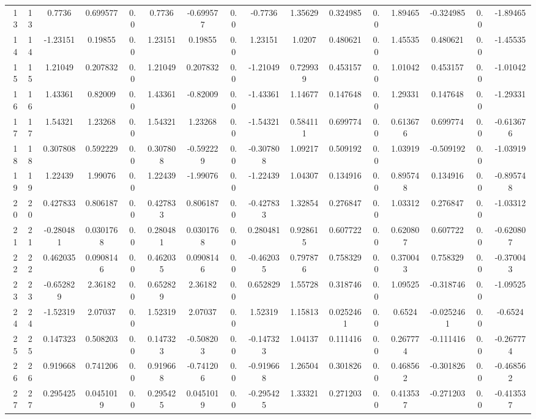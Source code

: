 \begin{tabular}{r|ccccccccccccccc}
	13 & 13 & 0.7736 & 0.699577 & 0.0 & 0.7736 & -0.699577 & 0.0 & -0.7736 & 1.35629 & 0.324985 & 0.0 & 1.89465 & -0.324985 & 0.0 & -1.89465 \\
	14 & 14 & -1.23151 & 0.19855 & 0.0 & 1.23151 & 0.19855 & 0.0 & 1.23151 & 1.0207 & 0.480621 & 0.0 & 1.45535 & 0.480621 & 0.0 & -1.45535 \\
	15 & 15 & 1.21049 & 0.207832 & 0.0 & 1.21049 & 0.207832 & 0.0 & -1.21049 & 0.729939 & 0.453157 & 0.0 & 1.01042 & 0.453157 & 0.0 & -1.01042 \\
	16 & 16 & 1.43361 & 0.82009 & 0.0 & 1.43361 & -0.82009 & 0.0 & -1.43361 & 1.14677 & 0.147648 & 0.0 & 1.29331 & 0.147648 & 0.0 & -1.29331 \\
	17 & 17 & 1.54321 & 1.23268 & 0.0 & 1.54321 & 1.23268 & 0.0 & -1.54321 & 0.584111 & 0.699774 & 0.0 & 0.613676 & 0.699774 & 0.0 & -0.613676 \\
	18 & 18 & 0.307808 & 0.592229 & 0.0 & 0.307808 & -0.592229 & 0.0 & -0.307808 & 1.09217 & 0.509192 & 0.0 & 1.03919 & -0.509192 & 0.0 & -1.03919 \\
	19 & 19 & 1.22439 & 1.99076 & 0.0 & 1.22439 & -1.99076 & 0.0 & -1.22439 & 1.04307 & 0.134916 & 0.0 & 0.895748 & 0.134916 & 0.0 & -0.895748 \\
	20 & 20 & 0.427833 & 0.806187 & 0.0 & 0.427833 & 0.806187 & 0.0 & -0.427833 & 1.32854 & 0.276847 & 0.0 & 1.03312 & 0.276847 & 0.0 & -1.03312 \\
	21 & 21 & -0.280481 & 0.0301768 & 0.0 & 0.280481 & 0.0301768 & 0.0 & 0.280481 & 0.928615 & 0.607722 & 0.0 & 0.620807 & 0.607722 & 0.0 & -0.620807 \\
	22 & 22 & 0.462035 & 0.0908146 & 0.0 & 0.462035 & 0.0908146 & 0.0 & -0.462035 & 0.797876 & 0.758329 & 0.0 & 0.370043 & 0.758329 & 0.0 & -0.370043 \\
	23 & 23 & -0.652829 & 2.36182 & 0.0 & 0.652829 & 2.36182 & 0.0 & 0.652829 & 1.55728 & 0.318746 & 0.0 & 1.09525 & -0.318746 & 0.0 & -1.09525 \\
	24 & 24 & -1.52319 & 2.07037 & 0.0 & 1.52319 & 2.07037 & 0.0 & 1.52319 & 1.15813 & 0.0252461 & 0.0 & 0.6524 & -0.0252461 & 0.0 & -0.6524 \\
	25 & 25 & 0.147323 & 0.508203 & 0.0 & 0.147323 & -0.508203 & 0.0 & -0.147323 & 1.04137 & 0.111416 & 0.0 & 0.267774 & -0.111416 & 0.0 & -0.267774 \\
	26 & 26 & 0.919668 & 0.741206 & 0.0 & 0.919668 & -0.741206 & 0.0 & -0.919668 & 1.26504 & 0.301826 & 0.0 & 0.468562 & -0.301826 & 0.0 & -0.468562 \\
	27 & 27 & 0.295425 & 0.0451019 & 0.0 & 0.295425 & 0.0451019 & 0.0 & -0.295425 & 1.33321 & 0.271203 & 0.0 & 0.413537 & -0.271203 & 0.0 & -0.413537 \\

\end{tabular}
